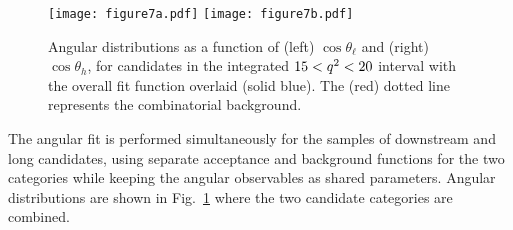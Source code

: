 \begin{figure}[tbp]
\centering
\texttt{[image: figure7a.pdf]}
\texttt{[image: figure7b.pdf]}
\caption{Angular distributions as a function of (left) $\cos
  \theta_\ell$ and (right) $\cos \theta_h$, for candidates in the
  integrated $15 < {q^2} <20$ \gevgevcccc interval with the overall fit
  function overlaid (solid blue). The (red) dotted line represents the
  combinatorial background.}
\label{fig:AngDistrib}
\end{figure}

The angular fit is performed simultaneously for the samples of downstream and
long candidates, 
using separate acceptance and background functions for the two
categories while keeping the angular observables as shared parameters.
Angular distributions are shown in Fig.~\ref{fig:AngDistrib} where the
two candidate categories are combined. 
